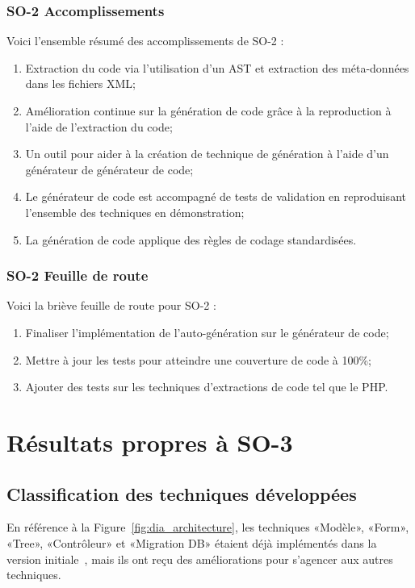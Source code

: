 \subsubsection{SO-2 Accomplissements}
Voici l'ensemble résumé des accomplissements de SO-2 :
\begin{enumerate}
    \item Extraction du code via l’utilisation d’un AST et extraction des méta-données dans les fichiers XML;
    \item Amélioration continue sur la génération de code grâce à la reproduction à l’aide de l’extraction du code;
    \item Un outil pour aider à la création de technique de génération à l’aide d’un générateur de générateur de code;
    \item Le générateur de code est accompagné de tests de validation en reproduisant l’ensemble des techniques en démonstration;
    \item La génération de code applique des règles de codage standardisées.
\end{enumerate}

\subsubsection{SO-2 Feuille de route}
Voici la briève feuille de route pour SO-2 :
\begin{enumerate}
    \item Finaliser l’implémentation de l'auto-génération sur le générateur de code;
    \item Mettre à jour les tests pour atteindre une couverture de code à 100\%;
    \item Ajouter des tests sur les techniques d’extractions de code tel que le PHP.
\end{enumerate}

\section{Résultats propres à SO-3}

\subsection{Classification des techniques développées}\label{result_technique_developpe}

En référence à la Figure~\ref{fig:dia_architecture}, les techniques «Modèle», «Form», «Tree», «Contrôleur» et «Migration DB» étaient déjà implémentés dans la version initiale~\cite{bluiksnot_repo}, mais ils ont reçu des améliorations pour s’agencer aux autres techniques.

